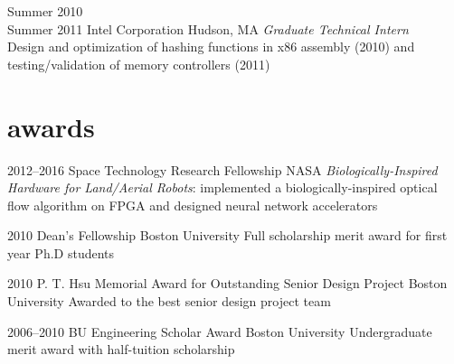 \documentclass[]{friggeri-cv} %
\begin{document}
\begin{entrylist}


\entry
{Summer 2010\\Summer 2011}
{Intel Corporation}
{Hudson, MA}
{\emph{Graduate Technical Intern} \\
  Design and optimization of hashing functions in x86 assembly (2010) and testing/validation of memory controllers (2011)
}


\end{entrylist}


\section{awards}

\begin{entrylist}


\entry
{2012--2016}
{Space Technology Research Fellowship}
{NASA}
{\emph{Biologically-Inspired Hardware for Land/Aerial Robots}: implemented a biologically-inspired optical flow algorithm on FPGA and designed neural network accelerators}

\entry
{2010}
{Dean's Fellowship}
{Boston University}
{Full scholarship merit award for first year Ph.D students}

\entry
{2010}
{P. T. Hsu Memorial Award for Outstanding Senior Design Project}
{Boston University}
{Awarded to the best senior design project team}

\entry
{2006--2010}
{BU Engineering Scholar Award}
{Boston University}
{Undergraduate merit award with half-tuition scholarship}


\end{entrylist}

\end{document}
